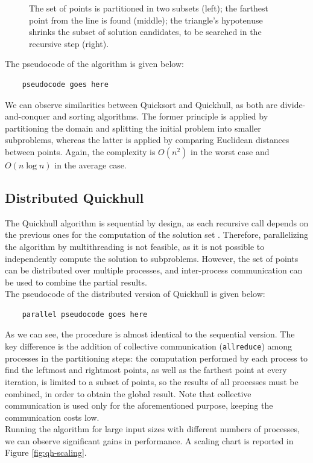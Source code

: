 \documentclass[]{finalproject}
\begin{document}
\begin{figure}[H]
\begin{minipage}{.33\linewidth}
	\end{minipage}
    \caption{The set of points is partitioned in two subsets (left); the farthest point from the line is found (middle); the triangle's hypotenuse shrinks the subset of solution candidates, to be searched in the recursive step (right).}
    \label{fig:qh-steps}
\end{figure}

The pseudocode of the algorithm is given below:
\begin{verbatim}
    pseudocode goes here
\end{verbatim}

\raggedright We can observe similarities between Quicksort and Quickhull,
as both are divide-and-conquer and sorting algorithms. The former principle is applied by partitioning the domain
and splitting the initial problem into smaller subproblems, whereas the latter is applied by comparing
Euclidean distances between points. Again, the complexity is $O(n^2)$ in the worst case and $O(n\log{n})$ in the average case.

\subsection{Distributed Quickhull}
The Quickhull algorithm is sequential by design,
as each recursive call depends on the previous ones for the computation of the solution set \cite{qhpaper}.
Therefore, parallelizing the algorithm by multithreading is not feasible, as it is not possible to independently compute the solution to subproblems.
However, the set of points can be distributed over multiple processes, and inter-process communication can be used to combine the partial results.\\
The pseudocode of the distributed version of Quickhull is given below:
\begin{verbatim}
    parallel pseudocode goes here
\end{verbatim}

\raggedright As we can see, the procedure is almost identical to the sequential version.
The key difference is the addition of collective communication (\verb|allreduce|) among processes in the partitioning steps:
the computation performed by each process to find the leftmost and rightmost points, as well as the farthest point at every iteration,
is limited to a subset of points, so the results of all processes must be combined, in order to obtain the global result.
Note that collective communication is used only for the aforementioned purpose, keeping the communication costs low.\\
Running the algorithm for large input sizes with different numbers of processes, we can observe significant gains in performance.
A scaling chart is reported in Figure \ref{fig:qh-scaling}.
\end{document}
